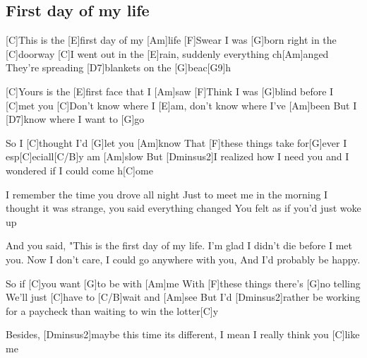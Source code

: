 \subsection*{First day of my life   }
\begin{guitar}

[C]This is the [E]first day of my [Am]life
[F]Swear I was [G]born right in the [C]doorway
[C]I went out in the [E]rain, suddenly everything ch[Am]anged
They're spreading [D7]blankets on the [G]beac[G9]h

[C]Yours is the [E]first face that I [Am]saw
[F]Think I was [G]blind before I [C]met you
[C]Don't know where I [E]am, don't know where I've [Am]been
But I [D7]know where I want to [G]go
 

So I [C]thought I'd [G]let you [Am]know
That [F]these things take for[G]ever
I esp[C]eciall[C/B]y am [Am]slow
But [Dminsus2]I realized how I need you and I wondered if I could come h[C]ome 




I remember the time you drove all night 
Just to meet me in the morning 
I thought it was strange, you said everything changed 
You felt as if you'd just woke up 

And you said, "This is the first day of my life.
I'm glad I didn't die before I met you.
Now I don't care, I could go anywhere with you,
And I'd probably be happy.


So if [C]you want [G]to be with [Am]me 
With [F]these things there's [G]no telling 
We'll just [C]have to [C/B]wait and [Am]see
But I'd [Dminsus2]rather be working for a paycheck than waiting to win the lotter[C]y 


Besides, [Dminsus2]maybe this time its different, I mean I really think you [C]like me
\end{guitar}
